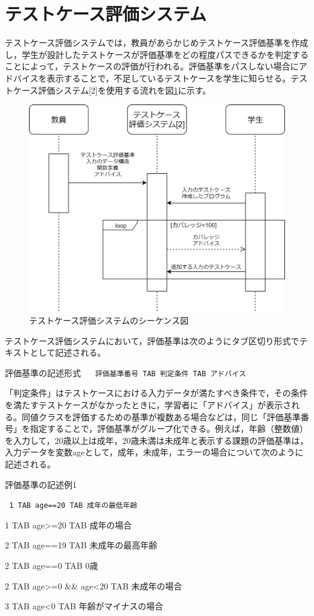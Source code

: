 \documentclass{tpu-sotu}
\begin{document}
\section{テストケース評価システム}
テストケース評価システムでは，教員があらかじめテストケース評価基準を作成し，学生が設計したテストケースが評価基準をどの程度パスできるかを判定することによって，テストケースの評価が行われる。評価基準をパスしない場合にアドバイスを表示することで，不足しているテストケースを学生に知らせる。テストケース評価システム[2]を使用する流れを図\ref{b1}に示す。
\begin{figure}[h]
  \centering
  \includegraphics[width=115mm]{シーケンス図1.png}
  \caption{テストケース評価システムのシーケンス図}
  \label{b1}
\end{figure}テストケース評価システムにおいて，評価基準は次のようにタブ区切り形式でテキストとして記述される。\\
\begin{minipage}[b]{\textwidth}
\begin{itembox}[l]{評価基準の記述形式}
{\tt
　評価基準番号 TAB 判定条件 TAB アドバイス
}
\end{itembox}
\end{minipage}

「判定条件」はテストケースにおける入力データが満たすべき条件で，その条件を満たすテストケースがなかったときに，学習者に「アドバイス」が表示される。同値クラスを評価するための基準が複数ある場合などは，同じ「評価基準番号」を指定することで，評価基準がグループ化できる。例えば，年齢（整数値）を入力して，20歳以上は成年，20歳未満は未成年と表示する課題の評価基準は，入力データを変数ageとして，成年，未成年，エラーの場合について次のように記述される。\\
\begin{minipage}[b]{\textwidth}
\begin{itembox}[l]{評価基準の記述例1}
{\tt
1 TAB age==20 TAB 成年の最低年齢

1 TAB age>=20 TAB 成年の場合

2 TAB age==19 TAB 未成年の最高年齢

2 TAB age==0 TAB 0歳

2 TAB age>=0 \&\& age<20 TAB 未成年の場合

3 TAB age<0 TAB 年齢がマイナスの場合
}
\end{itembox}
\end{minipage}
\end{document}
